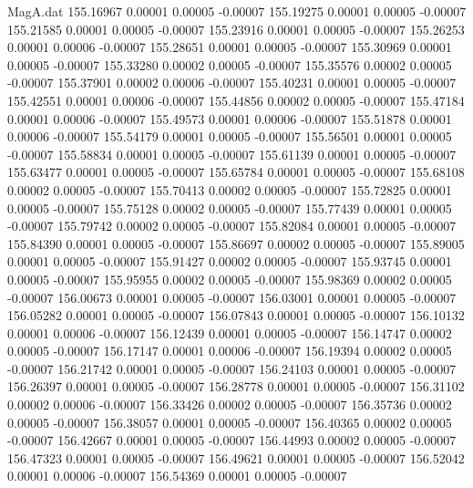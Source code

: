 \begin{filecontents}{MagA.dat}
 155.16967    0.00001    0.00005   -0.00007
 155.19275    0.00001    0.00005   -0.00007
 155.21585    0.00001    0.00005   -0.00007
 155.23916    0.00001    0.00005   -0.00007
 155.26253    0.00001    0.00006   -0.00007
 155.28651    0.00001    0.00005   -0.00007
 155.30969    0.00001    0.00005   -0.00007
 155.33280    0.00002    0.00005   -0.00007
 155.35576    0.00002    0.00005   -0.00007
 155.37901    0.00002    0.00006   -0.00007
 155.40231    0.00001    0.00005   -0.00007
 155.42551    0.00001    0.00006   -0.00007
 155.44856    0.00002    0.00005   -0.00007
 155.47184    0.00001    0.00006   -0.00007
 155.49573    0.00001    0.00006   -0.00007
 155.51878    0.00001    0.00006   -0.00007
 155.54179    0.00001    0.00005   -0.00007
 155.56501    0.00001    0.00005   -0.00007
 155.58834    0.00001    0.00005   -0.00007
 155.61139    0.00001    0.00005   -0.00007
 155.63477    0.00001    0.00005   -0.00007
 155.65784    0.00001    0.00005   -0.00007
 155.68108    0.00002    0.00005   -0.00007
 155.70413    0.00002    0.00005   -0.00007
 155.72825    0.00001    0.00005   -0.00007
 155.75128    0.00002    0.00005   -0.00007
 155.77439    0.00001    0.00005   -0.00007
 155.79742    0.00002    0.00005   -0.00007
 155.82084    0.00001    0.00005   -0.00007
 155.84390    0.00001    0.00005   -0.00007
 155.86697    0.00002    0.00005   -0.00007
 155.89005    0.00001    0.00005   -0.00007
 155.91427    0.00002    0.00005   -0.00007
 155.93745    0.00001    0.00005   -0.00007
 155.95955    0.00002    0.00005   -0.00007
 155.98369    0.00002    0.00005   -0.00007
 156.00673    0.00001    0.00005   -0.00007
 156.03001    0.00001    0.00005   -0.00007
 156.05282    0.00001    0.00005   -0.00007
 156.07843    0.00001    0.00005   -0.00007
 156.10132    0.00001    0.00006   -0.00007
 156.12439    0.00001    0.00005   -0.00007
 156.14747    0.00002    0.00005   -0.00007
 156.17147    0.00001    0.00006   -0.00007
 156.19394    0.00002    0.00005   -0.00007
 156.21742    0.00001    0.00005   -0.00007
 156.24103    0.00001    0.00005   -0.00007
 156.26397    0.00001    0.00005   -0.00007
 156.28778    0.00001    0.00005   -0.00007
 156.31102    0.00002    0.00006   -0.00007
 156.33426    0.00002    0.00005   -0.00007
 156.35736    0.00002    0.00005   -0.00007
 156.38057    0.00001    0.00005   -0.00007
 156.40365    0.00002    0.00005   -0.00007
 156.42667    0.00001    0.00005   -0.00007
 156.44993    0.00002    0.00005   -0.00007
 156.47323    0.00001    0.00005   -0.00007
 156.49621    0.00001    0.00005   -0.00007
 156.52042    0.00001    0.00006   -0.00007
 156.54369    0.00001    0.00005   -0.00007

\end{filecontents}
